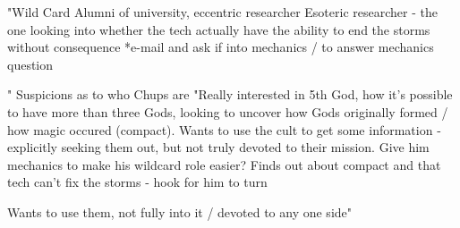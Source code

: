 \documentclass[char]{GL2020}
\begin{document}
\name{\cWildCard{}}







"Wild Card
Alumni of university, eccentric researcher 
Esoteric researcher - the one looking into whether the tech actually have the ability to end the storms without consequence
*e-mail and ask if into mechanics / to answer mechanics question

"	Suspicions as to who Chups are	"Really interested in 5th God, how it's possible to have more than three Gods, looking to uncover how Gods originally formed / how magic occured (compact). Wants to use the cult to get some information - explicitly seeking them out, but not truly devoted to their mission. Give him mechanics to make his wildcard role easier?
Finds out about compact and that tech can't fix the storms - hook for him to turn

Wants to use them, not fully into it / devoted to any one side"
\end{document}
